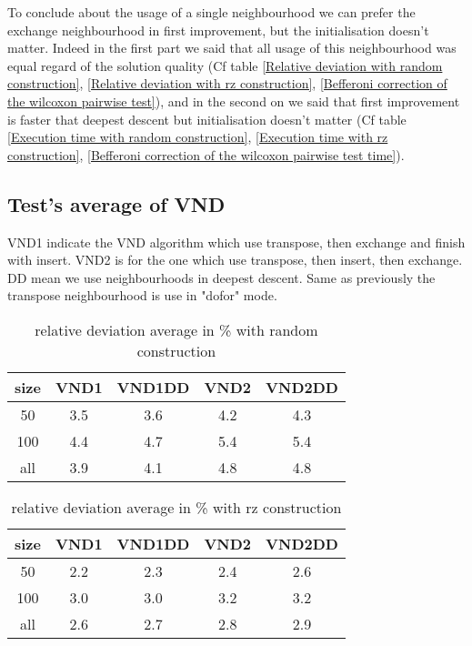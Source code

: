 \documentclass[12pt,a4paper]{article}
\begin{document}
To conclude about the usage of a single neighbourhood we can prefer the exchange neighbourhood in first improvement, but the initialisation doesn't matter. Indeed in the first part we said that all usage of this neighbourhood was equal regard of the solution quality (Cf table \ref{Relative deviation with random construction}, \ref{Relative deviation with rz construction}, \ref{Befferoni correction of the wilcoxon pairwise test}), and in the second on we said that first improvement is faster that deepest descent but initialisation doesn't matter (Cf table \ref{Execution time with random construction}, \ref{Execution time with rz construction}, \ref{Befferoni correction of the wilcoxon pairwise test time}).

\subsection{Test's average of VND}

VND1 indicate the VND algorithm which use transpose, then exchange and finish with insert. VND2 is for the one which use transpose, then insert, then exchange. DD mean we use neighbourhoods in deepest descent. Same as previously the transpose neighbourhood is use in "dofor" mode.

\begin{table}[!h]
\centering
\begin{tabular}{|*{5}{c|}}
  \hline
  size & VND1 & VND1DD & VND2 & VND2DD\\
  \hline
  50 & 3.5 & 3.6 & 4.2 & 4.3 \\ %
  100 & 4.4 & 4.7 & 5.4 & 5.4 \\ %
  all & 3.9 & 4.1 & 4.8 & 4.8 \\ %
  \hline
\end{tabular}
\caption{relative deviation average in \% with random construction}
\label{relative deviation of VND with random construction}
\end{table}

\begin{table}[!h]
\centering
\begin{tabular}{|*{5}{c|}}
  \hline
  size & VND1 & VND1DD & VND2 & VND2DD\\
  \hline
  50 & 2.2 & 2.3 & 2.4 & 2.6 \\ %
  100 & 3.0 & 3.0 & 3.2 & 3.2 \\ %
  all & 2.6 & 2.7 & 2.8 & 2.9 \\ %
  \hline
\end{tabular}
\caption{relative deviation average in \% with rz construction}
\label{relative deviation of VND with rz construction}
\end{table}
\end{document}
